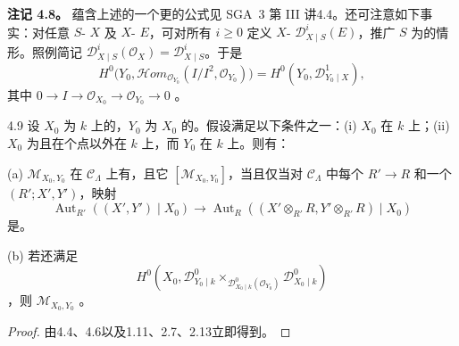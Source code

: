 \textbf{注记 4.8。} 蕴含上述的一个更的公式见 SGA~3 第 III 讲4.4。还可注意如下事实：对任意 $S$- $X$ 及 $X$- $E$，可对所有 $i\geq0$ 定义 $X$- $\mathcal D^i_{X\mid S}(E)$，推广 $S$ 为的情形。照例简记 $\mathcal D^i_{X\mid S}(\mathcal O_X)=\mathcal D^i_{X\mid S}$。于是
\[
H^0\bigl(Y_0,\mathcal Hom_{\mathcal O_{Y_0}}(I/I^2,\mathcal O_{Y_0})\bigr)
=H^0(Y_0,\mathcal D^1_{Y_0\mid X}),
\]
其中 $0\to I\to\mathcal O_{X_0}\to\mathcal O_{Y_0}\to0$ 。

\begin{SGAresult}{}{4.9}
设 $X_0$ 为 $k$ 上的，$Y_0$ 为 $X_0$ 的。假设满足以下条件之一：(i) $X_0$ 在 $k$ 上；(ii) $X_0$ 为且在个点以外在 $k$ 上，而 $Y_0$ 在 $k$ 上。则有：

(a) $\mathcal M_{X_0,Y_0}$ 在 $\mathcal C_\Lambda$ 上有，且它 $[\mathcal M_{X_0,Y_0}]$，当且仅当对 $\mathcal C_\Lambda$ 中每个 $R'\to R$ 和一个 $(R';X',Y')$，映射
\[
\operatorname{Aut}_{R'}((X',Y')\mid X_0)\longrightarrow
\operatorname{Aut}_R((X'\otimes_{R'}R,Y'\otimes_{R'}R)\mid X_0)
\]
是。

(b) 若还满足
\[
H^0\left(X_0,
\mathcal D^0_{Y_0\mid k}\mathbin{\times}_{\mathcal D^0_{X_0\mid k}(\mathcal O_{Y_0})}
\mathcal D^0_{X_0\mid k}\right)
\]
，则 $\mathcal M_{X_0,Y_0}$ 。
\end{SGAresult}
\begin{proof}
由4.4、4.6以及1.11、2.7、2.13立即得到。
\end{proof}

